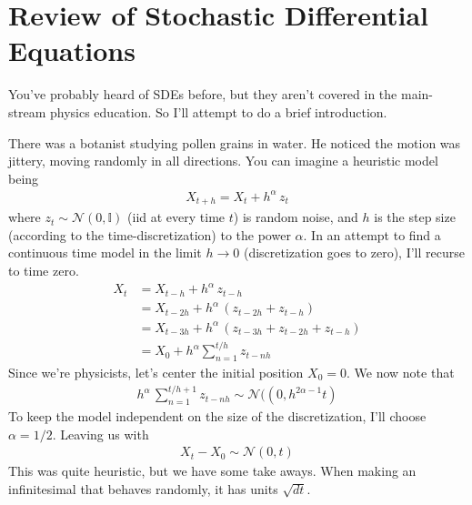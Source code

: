 \section{Review of Stochastic Differential Equations}
You've probably heard of SDEs before, but they aren't covered in the main-stream physics education. So I'll attempt to do a brief introduction. 

There was a botanist studying pollen grains in water. He noticed the motion was jittery, moving randomly in all directions. You can imagine a heuristic model being
\begin{align}
	X_{t+h} = X_t + h^\alpha \, z_t
\end{align}
where $z_t \sim \mathcal N(0, \mathbb I)$ (iid at every time $t$) is random noise, and $h$ is the step size (according to the time-discretization) to the power $\alpha$. In an attempt to find a continuous time model in the limit $h \to 0$ (discretization goes to zero), I'll recurse to time zero.
\begin{align}
	X_{t} &= X_{t-h} + h^\alpha \, z_{t-h}\\
	& = X_{t-2h} + h^\alpha \, (z_{t-2h} + z_{t-h})\\
	& = X_{t-3h} + h^\alpha \, (z_{t-3h} + z_{t-2h} + z_{t-h})\\
	& = X_0 + h^\alpha \sum_{n=1}^{t/h } z_{t - nh}
\end{align}
Since we're physicists, let's center the initial position $X_0 = 0$. We now note that
\begin{align}
	h^\alpha \, \sum_{n=1}^{t/h  + 1} z_{t - nh} \sim   \mathcal N(\left(0, h^{2\alpha - 1} t \right)
\end{align}
To keep the model independent on the size of the discretization, I'll choose $\alpha = 1/2$. Leaving us with
\begin{align}
	X_t - X_0 \sim \mathcal N(0, t)
\end{align}
This was quite heuristic, but we have some take aways. When making an infinitesimal that behaves randomly, it has units $\sqrt{dt}$.

